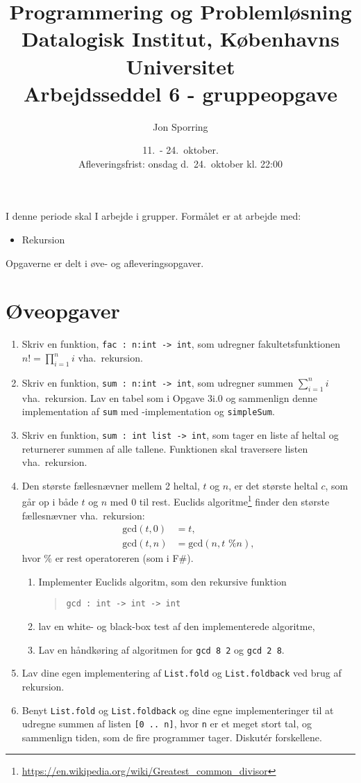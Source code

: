 \documentclass[a4paper,12pt]{article}
\title{Programmering og Problemløsning\\Datalogisk Institut,
  Københavns Universitet\\Arbejdsseddel 6 - gruppeopgave}
\author{Jon Sporring}
\date{11.\ - 24.\ oktober.\\Afleveringsfrist: onsdag d.\ 24.\ oktober kl. 22:00}
\begin{document}
\maketitle

I denne periode skal I arbejde i grupper. Formålet er at arbejde med:
\begin{itemize}
\item Rekursion
\end{itemize}
Opgaverne er delt i øve- og afleveringsopgaver. 

\section*{Øveopgaver}
\begin{enumerate}[label=6ø.\arabic*,start=0]
\item Skriv en funktion, \lstinline{fac : n:int -> int}, som udregner fakultetsfunktionen $n! = \prod_{i=1}^ni$ vha.\ rekursion.
\item Skriv en funktion, \lstinline{sum : n:int -> int}, som udregner summen $\sum_{i=1}^ni$ vha.\ rekursion. Lav en tabel som i Opgave 3i.0 og sammenlign denne implementation af \lstinline{sum} med -implementation og \lstinline{simpleSum}.
\item Skriv en funktion, \lstinline{sum : int list -> int}, som tager en liste af heltal og returnerer summen af alle tallene. Funktionen skal traversere listen vha.\ rekursion. 
\item \label{gcd} Den største fællesnævner mellem 2 heltal, $t$ og $n$, er det største heltal $c$, som går op i både $t$ og $n$ med $0$ til rest. Euclids algoritme\footnote{\url{https://en.wikipedia.org/wiki/Greatest_common_divisor}} finder den største fællesnævner vha.\ rekursion:
  \begin{align}
    \text{gcd}(t,0) &= t, \label{gcd:1}
    \\ \text{gcd}(t,n) &= \text{gcd}(n, t \text{ \% } n), \label{gcd:2}
  \end{align}
hvor $\%$ er rest operatoreren (som i F\#). 
\begin{enumerate}
\item Implementer Euclids algoritm, som den rekursive funktion
  \begin{quote}
    \lstinline{gcd : int -> int -> int}
  \end{quote}
\item lav en white- og black-box test af den implementerede algoritme,
\item Lav en håndkøring af algoritmen for \lstinline{gcd 8 2} og \lstinline{gcd 2 8}.
\end{enumerate}
\item Lav dine egen implementering af \lstinline{List.fold} og \lstinline{List.foldback} ved brug af rekursion. 
\item Benyt \lstinline{List.fold} og \lstinline{List.foldback} og dine egne implementeringer til at udregne summen af listen \lstinline{[0 .. n]}, hvor \lstinline{n} er et meget stort tal, og sammenlign tiden, som de fire programmer tager. Diskut\'{e}r forskellene.
\end{enumerate}
\end{document}
